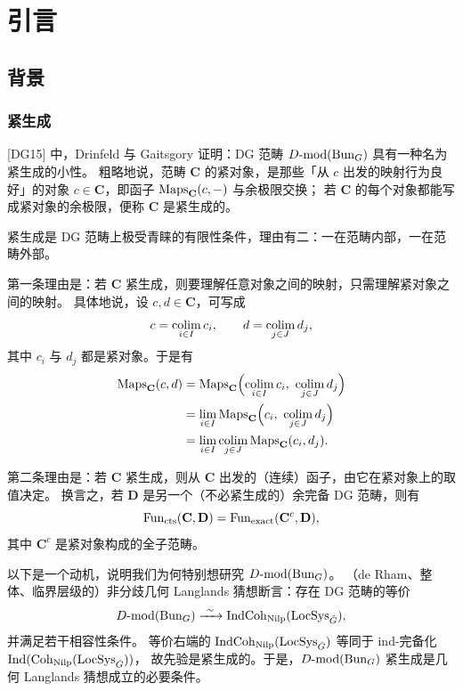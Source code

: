 
\chapter{引言}
\label{chap:intro}

\section{背景}
\label{sec:1.1}

\subsection{紧生成}
\label{sec:1.1.1}

[DG15] 中，Drinfeld 与 Gaitsgory 证明：DG 范畴 $D\text{-}\mathrm{mod}(\mathrm{Bun}_G)$ 具有一种名为紧生成的小性。
粗略地说，范畴 $\mathbf{C}$ 的紧对象，是那些「从 $c$ 出发的映射行为良好」的对象
$c\in\mathbf{C}$，即函子 $\operatorname{Maps}_{\mathbf{C}}(c,-)$ 与余极限交换；
若 $\mathbf{C}$ 的每个对象都能写成紧对象的余极限，便称 $\mathbf{C}$ 是紧生成的。%

紧生成是 DG 范畴上极受青睐的有限性条件，理由有二：一在范畴内部，一在范畴外部。

第一条理由是：若 $\mathbf{C}$ 紧生成，则要理解任意对象之间的映射，只需理解紧对象之间的映射。
具体地说，设 $c,d\in\mathbf{C}$，可写成
\[
c=\operatorname*{colim}_{i\in I}c_i,\qquad d=\operatorname*{colim}_{j\in J}d_j,
\]
其中 $c_i$ 与 $d_j$ 都是紧对象。于是有
\begin{align}
\operatorname{Maps}_{\mathbf{C}}(c,d)
&=\operatorname{Maps}_{\mathbf{C}}\Bigl(\operatorname*{colim}_{i\in I}c_i,\ \operatorname*{colim}_{j\in J}d_j\Bigr)\\
&=\lim_{i\in I}\operatorname{Maps}_{\mathbf{C}}\Bigl(c_i,\ \operatorname*{colim}_{j\in J}d_j\Bigr)\\
&=\lim_{i\in I}\operatorname*{colim}_{j\in J}\operatorname{Maps}_{\mathbf{C}}(c_i,d_j).
\end{align}

第二条理由是：若 $\mathbf{C}$ 紧生成，则从 $\mathbf{C}$ 出发的（连续）函子，由它在紧对象上的取值决定。
换言之，若 $\mathbf{D}$ 是另一个（不必紧生成的）余完备 DG 范畴，则有
\[
\operatorname{Fun}_{\mathrm{cts}}(\mathbf{C},\mathbf{D})=\operatorname{Fun}_{\mathrm{exact}}(\mathbf{C}^{c},\mathbf{D}),
\]
其中 $\mathbf{C}^{c}$ 是紧对象构成的全子范畴。

以下是一个动机，说明我们为何特别想研究 $D\text{-}\mathrm{mod}(\mathrm{Bun}_G)$。
（de Rham、整体、临界层级的）非分歧几何 Langlands 猜想断言：存在 DG 范畴的等价
\[
\Dmod(\Bun_G)\xrightarrow{\ \sim\ }\IndCoh_{\Nilp}(\LocSys_{\Gd}),
\]
并满足若干相容性条件。%
等价右端的 $\mathrm{IndCoh}_{\mathrm{Nilp}}(\mathrm{LocSys}_{\check{G}})$ 等同于 ind-完备化 $\operatorname{Ind}(\mathrm{Coh}_{\mathrm{Nilp}}(\mathrm{LocSys}_{\check{G}}))$，
故先验是紧生成的。于是，$D\text{-}\mathrm{mod}(\mathrm{Bun}_G)$ 紧生成是几何 Langlands 猜想成立的必要条件。

